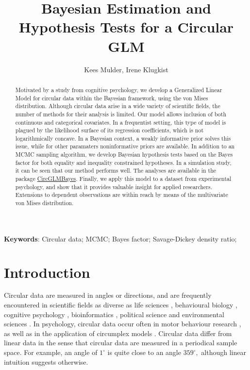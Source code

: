 \documentclass[11pt,a4paper]{article}\usepackage[]{graphicx}\usepackage[]{color}
\author{Kees Mulder, Irene Klugkist}
\title{Bayesian Estimation and Hypothesis Tests for a Circular GLM}
\begin{document}
\setcounter{topnumber}{1}

\maketitle




\begin{abstract}
Motivated by a study from cognitive psychology, we develop a Generalized Linear Model for circular data within the Bayesian framework, using the von Mises distribution. Although circular data arise in a wide variety of scientific fields, the number of methods for their analysis is limited. Our model allows inclusion of both continuous and categorical covariates. In a frequentist setting, this type of model is plagued by the likelihood surface of its regression coefficients, which is not logarithmically concave. In a Bayesian context, a weakly informative prior solves this issue, while for other paramaters noninformative priors are available. In addition to an MCMC sampling algorithm, we develop Bayesian hypothesis tests based on the Bayes factor for both equality and inequality constrained hypotheses. In a simulation study, it can be seen that our method performs well. The analyses are available in the package \href{https://github.com/keesmulder/CircGLMBayes}{CircGLMBayes}. Finally, we apply this model to a dataset from experimental psychology, and show that it provides valuable insight for applied researchers. Extensions to dependent observations are within reach by means of the multivariate von Mises distribution.
\end{abstract}

\textbf{Keywords}: Circular data; MCMC; Bayes factor; Savage-Dickey density ratio;

\section{Introduction}

Circular data are measured in angles or directions, and are frequently encountered in scientific fields as diverse as life sciences \citep{mardianew}, behavioural biology \citep{bulbert2015danger}, cognitive psychology \citep{kaas2006haptic}, bioinformatics \citep{mardia2008multivariate}, political science \citep{gill2010} and environmental sciences \citep{lagona2016regression, lagona2015hidden, arnold2006recent}. In psychology, circular data occur often in motor behaviour research \citep{mechsner2001perceptual, mechsner2007bimanual, postma2008keep, baayen2012test}, as well as in the application of circumplex models \citep{Leary1957, gurtman2003circumplex, gurtman2009exploring}. Circular data differ from linear data in the sense that circular data are measured in a periodical sample space. For example, an angle of $1^{\circ}$ is quite close to an angle $359^{\circ},$ although linear intuition suggests otherwise.
\end{document}
